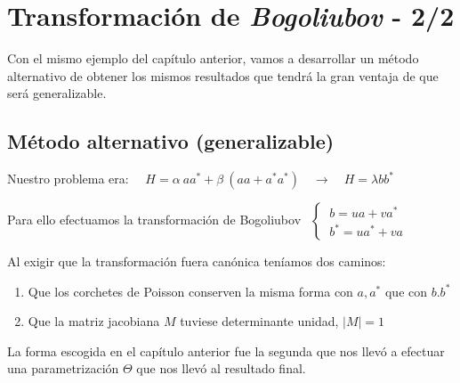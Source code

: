 \chapter{Transformación de \emph{Bogoliubov} - 2/2}




\vspace{10mm}
\begin{adjustwidth}{50pt}{50pt}
\begin{ejemplo}

Con el mismo ejemplo del capítulo anterior, vamos a desarrollar un método alternativo de obtener los mismos resultados que tendrá la gran ventaja de que será generalizable.

\end{ejemplo}
\end{adjustwidth}
\vspace{5mm}

\section{Método alternativo (generalizable)}


Nuestro problema era: 
$\quad H=\alpha \ a a^* + \beta \ (aa+a^*a^*) \quad \to \quad H=\lambda b b^*$

Para ello efectuamos la transformación de Bogoliubov $\ \ \begin{cases} 
 \ b=ua+va^* \\ \ b^*=ua^*+va \end{cases}\ $  

Al exigir que la transformación fuera canónica teníamos dos caminos:

\begin{enumerate}
\item Que los corchetes de Poisson conserven la misma forma con $a,a^*$ que con $b.b^*$
\item Que la matriz jacobiana $M$ tuviese determinante unidad, $|M|=1$	
\end{enumerate}

La forma escogida en el capítulo anterior fue la segunda que nos llevó a efectuar una parametrización $\Theta$ que nos llevó al resultado final.

